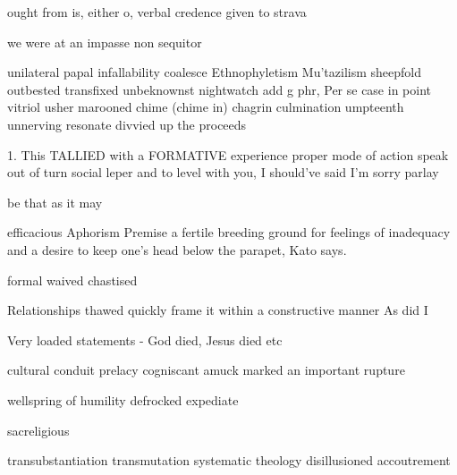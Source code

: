 ought from is, either o, verbal credence given to
strava

we were at an impasse
non sequitor

unilateral papal infallability
coalesce
Ethnophyletism
Mu'tazilism
sheepfold
outbested
transfixed
unbeknownst
nightwatch
add g phr,
Per se
case in point
vitriol
usher
marooned
chime (chime in)
chagrin
culmination
umpteenth
unnerving
resonate
divvied up the proceeds

1. This TALLIED with a FORMATIVE experience
proper mode of action
speak out of turn
social leper
and to level with you, I should've said I'm sorry
parlay

be that as it may

efficacious
Aphorism
Premise
 a fertile breeding ground for feelings of inadequacy and a desire to keep one’s head below the parapet, Kato says.

formal
waived
chastised

Relationships thawed
quickly frame it within a constructive manner
As did I

Very loaded statements - God died, Jesus died etc


cultural conduit
prelacy
cogniscant
amuck
marked an important rupture

wellspring of humility
defrocked
expediate

sacreligious

transubstantiation
transmutation
systematic theology
disillusioned
accoutrement

